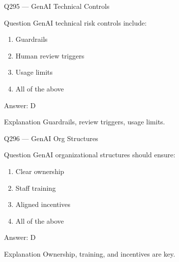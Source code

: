 \documentclass[aspectratio=169,8pt]{beamer}
\begin{document}
										\begin{frame}{Q295 --- GenAI Technical Controls}
											\begin{block}{Question}
												GenAI technical risk controls include:
												\begin{enumerate}
													\item Guardrails
													\item Human review triggers
													\item Usage limits
													\item All of the above
												\end{enumerate}
											\end{block}
											\begin{exampleblock}{Answer: D}\end{exampleblock}
											\begin{block}{Explanation}
												Guardrails, review triggers, usage limits.
											\end{block}
										\end{frame}
										
										\begin{frame}{Q296 --- GenAI Org Structures}
											\begin{block}{Question}
												GenAI organizational structures should ensure:
												\begin{enumerate}
													\item Clear ownership
													\item Staff training
													\item Aligned incentives
													\item All of the above
												\end{enumerate}
											\end{block}
											\begin{exampleblock}{Answer: D}\end{exampleblock}
											\begin{block}{Explanation}
												Ownership, training, and incentives are key.
											\end{block}
										\end{frame}
										
\end{document}

